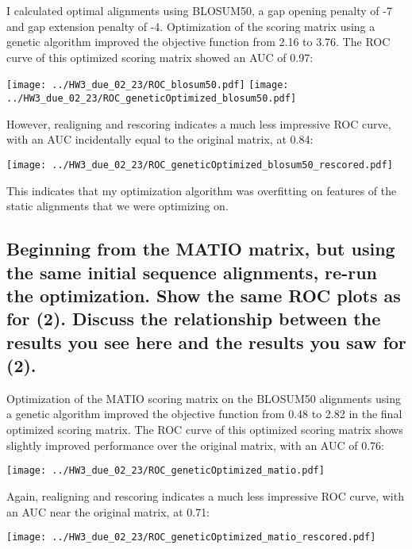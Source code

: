 \documentclass[]{article}
\begin{document}
I calculated optimal alignments using BLOSUM50, a gap opening penalty of -7 and gap extension penalty of -4. Optimization of the scoring matrix using a genetic algorithm improved the objective function from 2.16 to 3.76. The ROC curve of this optimized scoring matrix showed an AUC of 0.97:

\vspace{1em}
\texttt{[image: ../HW3\_due\_02\_23/ROC\_blosum50.pdf]}
\texttt{[image: ../HW3\_due\_02\_23/ROC\_geneticOptimized\_blosum50.pdf]}
\vspace{1em}

However, realigning and rescoring indicates a much less impressive ROC curve, with an AUC incidentally equal to the original matrix, at 0.84: 

\vspace{1em}
\texttt{[image: ../HW3\_due\_02\_23/ROC\_geneticOptimized\_blosum50\_rescored.pdf]}
\vspace{1em}

This indicates that my optimization algorithm was overfitting on features of the static alignments that we were optimizing on.

\subsection{Beginning from the MATIO matrix, but using the same initial sequence alignments, re-run the optimization. Show the same ROC plots as for (2). Discuss the relationship between the results you see here and the results you saw for (2).}

Optimization of the MATIO scoring matrix on the BLOSUM50 alignments using a genetic algorithm improved the objective function from 0.48 to 2.82 in the final optimized scoring matrix. The ROC curve of this optimized scoring matrix shows slightly improved performance over the original matrix, with an AUC of 0.76:

\vspace{1em}
\texttt{[image: ../HW3\_due\_02\_23/ROC\_geneticOptimized\_matio.pdf]}
\vspace{1em}

Again, realigning and rescoring indicates a much less impressive ROC curve, with an AUC near the original matrix, at 0.71:


\vspace{1em}
\texttt{[image: ../HW3\_due\_02\_23/ROC\_geneticOptimized\_matio\_rescored.pdf]}
\vspace{1em}
\end{document}
